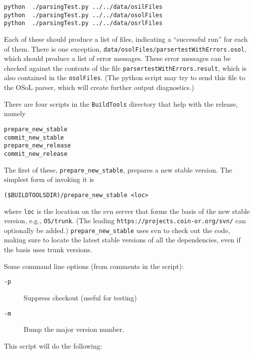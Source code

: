 \begin{itemize}
\begin{verbatim}
python  ./parsingTest.py ../../data/osilFiles
python  ./parsingTest.py ../../data/osolFiles
python  ./parsingTest.py ../../data/osrlFiles
\end{verbatim}

Each of these should produce a list of files, indicating a ``successful run'' for each of them. There is one exception, {\tt data/osolFiles/parsertestWithErrors.osol}, which should produce a list of error messages. These error messages can be checked against the contents of the file 
{\tt parsertestWithErrors.result}, which is also contained in the {\tt osolFiles}. (The python script may try to send this file to the OSoL parser, which will create further output diagnostics.)
\end{itemize}


\label{section:ReleasePrep}

There are four scripts in the {\tt BuildTools} directory that help with the release, namely

\begin{verbatim}
prepare_new_stable
commit_new_stable
prepare_new_release
commit_new_release
\end{verbatim}

\medskip

The first of these, {\tt prepare\_new\_stable}, prepares a new stable version. The simplest form of invoking it is

\begin{verbatim}
($BUILDTOOLSDIR)/prepare_new_stable <loc>
\end{verbatim}

where {\tt loc} is the location on the svn server that forms the basis of the new stable version, e.g., {\tt OS/trunk}. (The leading {\tt https://projects.coin-or.org/svn/} can optionally be added.)
{\tt prepare\_new\_stable} uses svn to check out the code, making sure to locate the latest stable versions of all the dependencies, even if the basis uses trunk versions.

Some command line options (from comments in the script):

\begin{description}
  \item[\tt -p]			Suppress checkout (useful for testing)
  \item[\tt -m] 		Bump the major version number.
\end{description}

This script will do the following:

